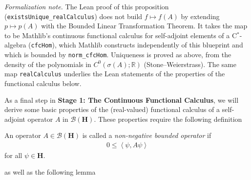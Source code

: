 \noindent\textit{Formalization note.} The Lean proof of this proposition (\texttt{existsUnique\_realCalculus}) does not build $f \mapsto f(A)$ by extending $p \mapsto p(A)$ with the Bounded Linear Transformation Theorem. It takes the map to be Mathlib's continuous functional calculus for self-adjoint elements of a C$^*$-algebra (\texttt{cfcHom}), which Mathlib constructs independently of this blueprint and which is bounded by \texttt{norm\_cfcHom}. Uniqueness is proved as above, from the density of the polynomials in $C^0(\sigma(A);\mathbb{R})$ (Stone--Weierstrass). The same map \texttt{realCalculus} underlies the Lean statements of the properties of the functional calculus below.

As a final step in \textbf{Stage 1: The Continuous Functional Calculus}, we will derive some basic properties of the (real-valued) functional calculus of a self-adjoint operator $A$ in $\mathcal{B}(\mathbf{H})$. These properties require the following definition

\begin{definition}
    \label{def:non-negative-operator}
    \leanok
    An operator $A \in \mathcal{B}(\mathbf{H})$ is called a \textit{non-negative bounded operator} if
    \begin{align}
        0 \le \left< \psi, A\psi \right>
    \end{align}
    for all $\psi \in \mathbf{H}$.
\end{definition}

as well as the following lemma

